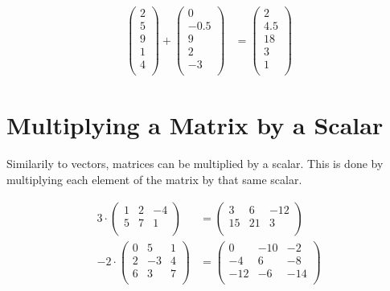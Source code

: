 \begin{example}
\begin{align*}
	\begin{pmatrix}
	  2 \\
	  5 \\
	  9 \\
	  1 \\
	  4 \\
	\end{pmatrix} +
	\begin{pmatrix}
	  0 \\
	  -0.5 \\
	  9 \\
	  2 \\
	  -3 \\
	\end{pmatrix} &=
	\begin{pmatrix}
	  2 \\
	  4.5 \\
	  18 \\
	  3 \\
	  1 \\
	\end{pmatrix}
  \end{align*}
\end{example}

\section{Multiplying a Matrix by a Scalar}
Similarily to vectors, matrices can be multiplied by a scalar. This is done by multiplying each element of the matrix by that same scalar.
\begin{example}
  \begin{align*}
	3\cdot
	\begin{pmatrix}
	  1 & 2 & -4 \\
	  5 & 7 & 1\\
	\end{pmatrix} &=
	\begin{pmatrix}
	  3 & 6 & -12\\
	  15 & 21 & 3\\
	\end{pmatrix}\\[5mm]
	-2\cdot
	\begin{pmatrix}
	  0 & 5 & 1 \\
	  2 & -3 & 4\\
	  6 & 3 & 7\\
	\end{pmatrix} &=
	\begin{pmatrix}
	  0 & -10 & -2\\
	  -4 & 6 & -8\\
	  -12 & -6 & -14\\
	\end{pmatrix}
  \end{align*}
\end{example}

